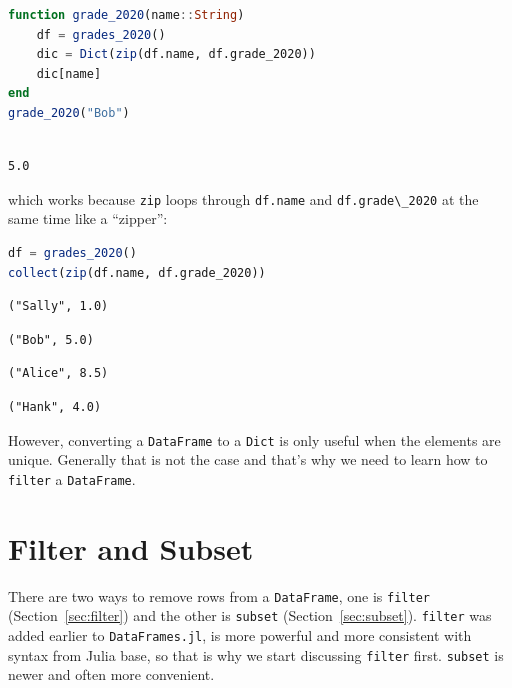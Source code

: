 \documentclass[
  notoc %
]{tufte-book}
\newcommand{\passthrough}[1]{#1}
\begin{document}
\begin{lstlisting}[language=Julia]
function grade_2020(name::String)
    df = grades_2020()
    dic = Dict(zip(df.name, df.grade_2020))
    dic[name]
end
grade_2020("Bob")
\end{lstlisting}

\begin{lstlisting}[language=Output]

5.0

\end{lstlisting}

which works because \passthrough{\lstinline!zip!} loops through
\passthrough{\lstinline!df.name!} and
\passthrough{\lstinline!df.grade\_2020!} at the same time like a
``zipper'':

\begin{lstlisting}[language=Julia]
df = grades_2020()
collect(zip(df.name, df.grade_2020))
\end{lstlisting}

\begin{lstlisting}[language=Output]
("Sally", 1.0)
\end{lstlisting}

\begin{lstlisting}[language=Output]
("Bob", 5.0)
\end{lstlisting}

\begin{lstlisting}[language=Output]
("Alice", 8.5)
\end{lstlisting}

\begin{lstlisting}[language=Output]
("Hank", 4.0)
\end{lstlisting}

However, converting a \passthrough{\lstinline!DataFrame!} to a
\passthrough{\lstinline!Dict!} is only useful when the elements are
unique. Generally that is not the case and that's why we need to learn
how to \passthrough{\lstinline!filter!} a
\passthrough{\lstinline!DataFrame!}.

\hypertarget{sec:filter_subset}{%
\section{Filter and Subset}\label{sec:filter_subset}}

There are two ways to remove rows from a
\passthrough{\lstinline!DataFrame!}, one is
\passthrough{\lstinline!filter!} (Section~\ref{sec:filter}) and the
other is \passthrough{\lstinline!subset!} (Section~\ref{sec:subset}).
\passthrough{\lstinline!filter!} was added earlier to
\passthrough{\lstinline!DataFrames.jl!}, is more powerful and more
consistent with syntax from Julia base, so that is why we start
discussing \passthrough{\lstinline!filter!} first.
\passthrough{\lstinline!subset!} is newer and often more convenient.
\end{document}
